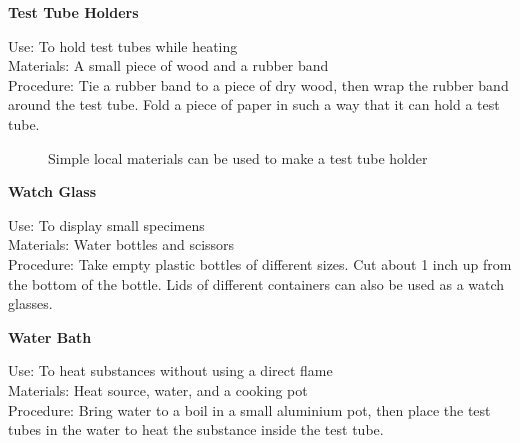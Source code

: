 \begin{flushleft}
\textbf{Test Tube Holders}
\end{flushleft}
\vspace{-10pt}
Use: To hold test tubes while heating\\
Materials: A small piece of wood and a rubber band\\
Procedure: Tie a rubber band to a piece of dry wood, then wrap the rubber band around the test tube. Fold a piece of paper in such a way that it can hold a test tube.\\

\begin{figure}[h]
\begin{center}
\def\svgwidth{4cm}

\caption{Simple local materials can be used to make a test tube holder}
\label{fig:tube-holder}
\end{center}
\end{figure}


\begin{flushleft}
\textbf{Watch Glass}
\end{flushleft}
\vspace{-10pt}
Use: To display small specimens\\
Materials: Water bottles and scissors\\
Procedure: Take empty plastic bottles of different sizes. Cut about 1 inch up from the bottom of the bottle. Lids of different containers can also be used as a watch glasses.\\

\begin{flushleft}
\textbf{Water Bath}
\end{flushleft}
\vspace{-10pt}
Use: To heat substances without using a direct flame\\
Materials: Heat source, water, and a cooking pot\\
Procedure: Bring water to a boil in a small aluminium pot, then place the test tubes in the water to heat the substance inside the test tube.\\

